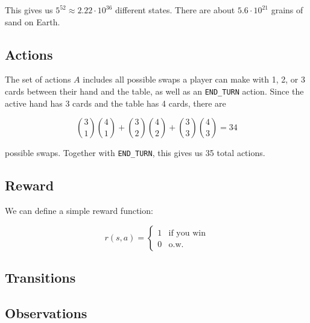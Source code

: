 \documentclass[11pt]{article}
\begin{document}
This gives us $5^{52} \approx 2.22 \cdot 10^{36}$ different states. There are about $5.6 \cdot 10^{21}$ grains of sand on Earth.

\subsection{Actions}

The set of actions $A$ includes all possible swaps a player can make with 1, 2, or 3 cards between their hand and the table, as well as an \texttt{END\_TURN} action. Since the active hand has 3 cards and the table has 4 cards, there are

\begin{equation}
  {3 \choose 1}{4 \choose 1} + {3 \choose 2}{4 \choose 2} + {3 \choose 3}{4 \choose 3} = 34
\label{eq:swaps}\end{equation}

possible swaps. Together with \texttt{END\_TURN}, this gives us 35 total actions.

\subsection{Reward}

We can define a simple reward function:

\begin{equation}
  r(s,a) = \begin{cases}
    1 & \text{if you win} \\
    0 & \text{o.w.}
  \end{cases}
\end{equation}

\subsection{Transitions}

\subsection{Observations}
\end{document}
